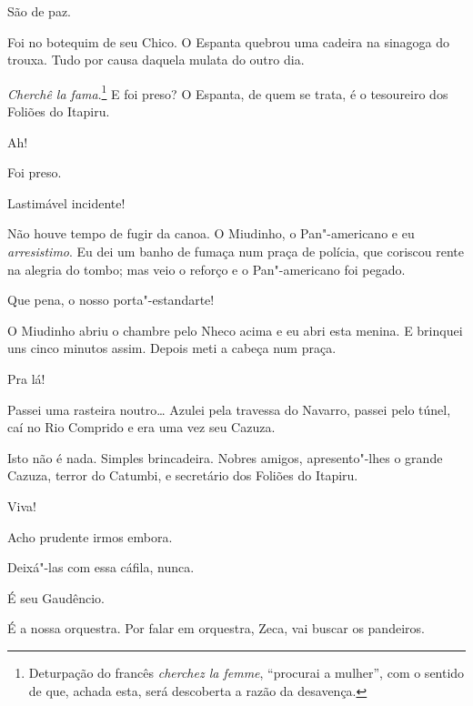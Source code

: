 \begin{linenumbers}
 São de paz.

 Foi no botequim de
seu Chico. O Espanta quebrou uma cadeira na sinagoga
do trouxa. Tudo por causa daquela mulata do outro dia.

 \textit{Cherchê la fama}.\footnote{
Deturpação do francês \textit{cherchez la femme}, ``procurai a mulher'', com
o sentido de que, achada esta, será descoberta a razão da desavença.}
E foi preso?  O Espanta, de quem se trata,
é o tesoureiro dos Foliões do Itapiru.

 Ah!

 Foi preso.

 Lastimável incidente!

 Não houve tempo de
fugir da canoa. O Miudinho, o Pan"-americano e eu
\textit{arresistimo}. Eu dei um banho de
fumaça num praça de polícia, que coriscou rente na
alegria do tombo; mas veio o reforço e o
Pan"-americano foi pegado.

 Que pena, o nosso
porta"-estandarte!

 O Miudinho abriu o chambre pelo Nheco
acima e eu abri esta menina.  E brinquei uns
cinco minutos assim. Depois meti a cabeça num praça.

 Pra lá!

 Passei uma rasteira noutro\ldots{}  Azulei pela travessa do Navarro, passei pelo túnel, caí no
Rio Comprido e era uma vez seu Cazuza. 

 
 Isto não é nada.  Simples brincadeira.  Nobres
amigos, apresento"-lhes o grande Cazuza, terror do Catumbi, e secretário dos
Foliões do Itapiru.

 Viva!

   Acho prudente irmos embora.

 Deixá"-las com essa cáfila, nunca. 

  É seu Gaudêncio.

 É a nossa orquestra. Por falar em orquestra, Zeca, vai
buscar os pandeiros.  


\end{linenumbers}
